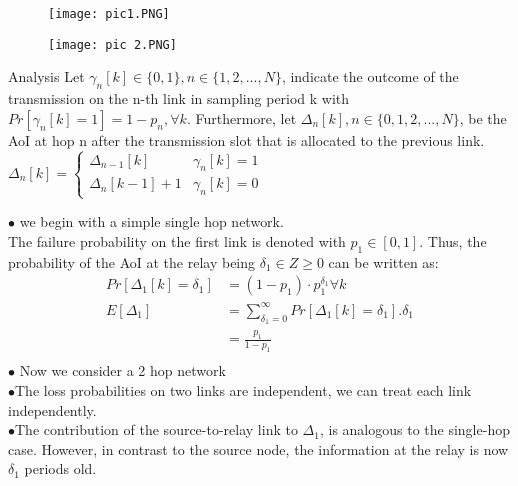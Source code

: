 \documentclass{beamer}
\begin{document}
\begin{frame}{}
    \begin{figure}[h]
    \centering
    \texttt{[image: pic1.PNG]}
\end{figure} 
\end{frame}


 \begin{frame}
   \begin{figure}[h]
    \centering
    \texttt{[image: pic 2.PNG]}
\end{figure}   
 \end{frame}


\begin{frame}{Analysis}
Let $\gamma_{n}[k] \in \{0, 1\}, n \in \{1, 2,..., N \}$, indicate the outcome
of the transmission on the n-th link in sampling period k with
$Pr[\gamma_{n}[k] = 1] = 1-p_n, \forall k$. Furthermore, let $ \Delta_n[k], n \in
\{0, 1, 2,..., N \}$, be the AoI at hop n after the transmission
slot that is allocated to the previous link.\\
$
\Delta_n[k]=
\begin{cases}
 \Delta_{n-1}[k]&\gamma_n[k]=1\\
 \Delta_{n}[k-1]+1 &\gamma_n[k]=0
\end{cases}
$
\end{frame}

\begin{frame}{}
   $\bullet$ we begin with a simple single hop network.\\
   The failure probability on the first link is denoted with
$p_1 \in [0, 1]$. Thus, the probability of the AoI at the relay being
$\delta_1 \in Z\geq 0$ can be written as:\\
\begin{align*}
    Pr[\Delta_1[k] = \delta_1] &= (1-p_1) · p_1^{\delta_1} \forall k\\
    E[\Delta_1]&=\sum_{\delta_1=0}^\infty Pr[\Delta_1[k]=\delta_1].\delta_1\\
    &=\frac{p_1}{1-p_1}\\
    \end{align*}
    $\bullet$ Now we consider a 2 hop network\\
    $\bullet$The loss probabilities on two links are independent, we can treat each link independently.\\
    $\bullet$The contribution of the source-to-relay link to $\Delta_1$, is analogous to the single-hop case. However, in contrast to the source
node, the information at the relay is now $\delta_1$ periods old.\\
\end{frame}
\end{document}
